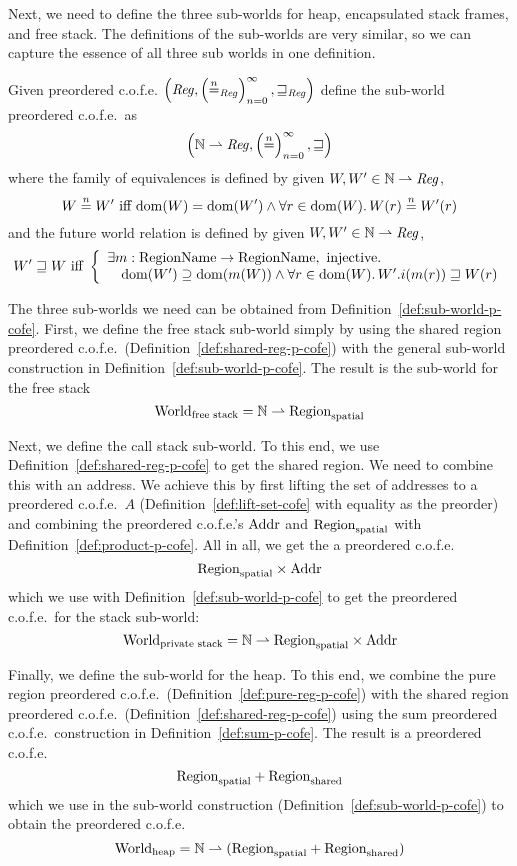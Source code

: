 \begin{jversion}
Next, we need to define the three sub-worlds for heap, encapsulated stack frames, and free stack.
The definitions of the sub-worlds are very similar, so we can capture the essence of all three sub worlds in one definition.
\begin{definition}
  \label{def:sub-world-p-cofe}
  Given preordered c.o.f.e. $\left(\var{Reg},\left(\nequal[n]_\var{Reg}\right)_{n=0}^{\infty},\future_\var{Reg}\right)$ define the sub-world preordered c.o.f.e.\ as
  \[
    \left(\nats \parfun \var{Reg},\left(\nequal[n]\right)_{n=0}^{\infty},\future \right)
  \]
  where the family of equivalences is defined by given $W,W' \in \nats \parfun \var{Reg}$,
  \[
    W \nequal W' \text{ iff } \dom(W) = \dom(W') \wedge \forall r \in \dom(W)\ldotp W(r) \nequal W'(r)
  \]
  and the future world relation is defined by given $W,W' \in \nats \parfun \var{Reg}$,
  \[
  W' \future W \text{ iff } \left\{
    \array{l}
    \exists m : \RegionName \fun \RegionName, \text{ injective}\ldotp\\
    \quad \dom(W') \supseteq \dom(m(W)) \wedge \forall r \in \dom(W)\ldotp W'.i(m(r)) \future W(r)
     \endarray
  \right.
\]
\end{definition}
The three sub-worlds we need can be obtained from Definition~\ref{def:sub-world-p-cofe}.
First, we define the free stack sub-world simply by using the shared region preordered c.o.f.e.\ (Definition~\ref{def:shared-reg-p-cofe}) with the general sub-world construction in Definition~\ref{def:sub-world-p-cofe}.
The result is the sub-world for the free stack
\[
  \Worldfs = \nats \parfun \Regions
\]

Next, we define the call stack sub-world.
To this end, we use Definition~\ref{def:shared-reg-p-cofe} to get the shared region.
We need to combine this with an address.
We achieve this by first lifting the set of addresses to a preordered c.o.f.e.\ $A$ (Definition~\ref{def:lift-set-cofe} with equality as the preorder) and combining the preordered c.o.f.e.'s $\Addr$ and $\Regions$ with Definition~\ref{def:product-p-cofe}.
All in all, we get the a preordered c.o.f.e.\
\[
  \Regions \times \Addr
\]
which we use with Definition~\ref{def:sub-world-p-cofe} to get the preordered c.o.f.e.\ for the stack sub-world:
\[
  \Worlds = \nats \parfun \Regions \times \Addr
\]

Finally, we define the sub-world for the heap.
To this end, we combine the pure region preordered c.o.f.e.\ (Definition~\ref{def:pure-reg-p-cofe}) with the shared region preordered c.o.f.e.\ (Definition~\ref{def:shared-reg-p-cofe}) using the sum preordered c.o.f.e.\ construction in Definition~\ref{def:sum-p-cofe}.
The result is a preordered c.o.f.e.\
\[
  \Regions + \Regionh
\]
which we use in the sub-world construction (Definition~\ref{def:sub-world-p-cofe}) to obtain the preordered c.o.f.e.\
\[
  \Worldh = \nats \parfun (\Regions + \Regionh)
\]


\end{jversion}
